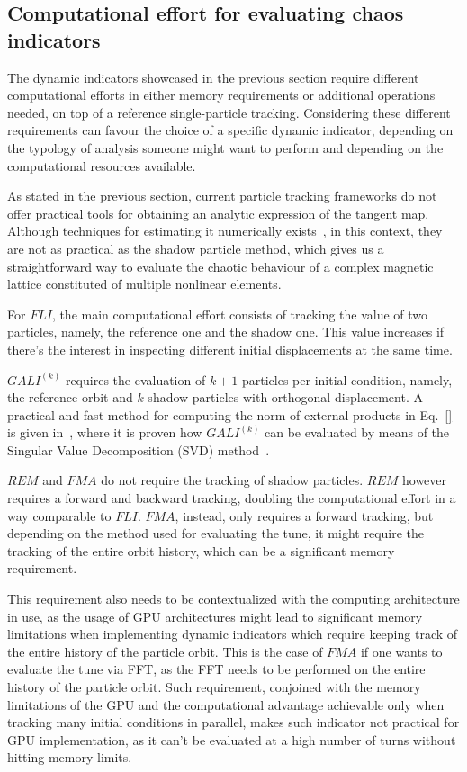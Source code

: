 \subsection{Computational effort for evaluating chaos indicators}

The dynamic indicators showcased in the previous section require different computational efforts in either memory requirements or additional operations needed, on top of a reference single-particle tracking. Considering these different requirements can favour the choice of a specific dynamic indicator, depending on the typology of analysis someone might want to perform and depending on the computational resources available.

As stated in the previous section, current particle tracking frameworks do not offer practical tools for obtaining an analytic expression of the tangent map. Although techniques for estimating it numerically exists~\cite{}, in this context, they are not as practical as the shadow particle method, which gives us a straightforward way to evaluate the chaotic behaviour of a complex magnetic lattice constituted of multiple nonlinear elements.

For $FLI$, the main computational effort consists of tracking the value of two particles, namely, the reference one and the shadow one. This value increases if there's the interest in inspecting different initial displacements at the same time.

$GALI^{(k)}$ requires the evaluation of $k+1$ particles per initial condition, namely, the reference orbit and $k$ shadow particles with orthogonal displacement. A practical and fast method for computing the norm of external products in Eq.~\eqref{} is given in~\cite{Skokos2008}, where it is proven how $GALI^{(k)}$ can be evaluated by means of the Singular Value Decomposition (SVD) method~\cite{10.5555/1403886}.

$REM$ and $FMA$ do not require the tracking of shadow particles. $REM$ however requires a forward and backward tracking, doubling the computational effort in a way comparable to $FLI$. $FMA$, instead, only requires a forward tracking, but depending on the method used for evaluating the tune, it might require the tracking of the entire orbit history, which can be a significant memory requirement.

This requirement also needs to be contextualized with the computing architecture in use, as the usage of GPU architectures might lead to significant memory limitations when implementing dynamic indicators which require keeping track of the entire history of the particle orbit. This is the case of $FMA$ if one wants to evaluate the tune via FFT, as the FFT needs to be performed on the entire history of the particle orbit. Such requirement, conjoined with the memory limitations of the GPU and the computational advantage achievable only when tracking many initial conditions in parallel, makes such indicator not practical for GPU implementation, as it can't be evaluated at a high number of turns without hitting memory limits.

